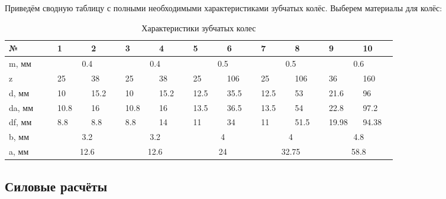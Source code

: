 \documentclass[14pt,a4paper,russian]{scrartcl}
\begin{document}
        Приведём сводную таблицу с полными необходимыми характеристиками зубчатых колёс.
        Выберем материалы для колёс:
        \begin{table}[h!]
            \begin{center}
                \begin{tabular}{p{0.1\linewidth}|p{0.07\linewidth}p{0.07\linewidth}p{0.07\linewidth}p{0.07\linewidth}p{0.07\linewidth}p{0.07\linewidth}p{0.07\linewidth}p{0.07\linewidth}p{0.07\linewidth}p{0.07\linewidth}}
                    \hline
                    №   & 1&2&3&4&5&6&7&8&9&10\\
                    \hline
                    m, мм  & \multicolumn{2}{c}{0.4} & \multicolumn{2}{c}{0.4} & \multicolumn{2}{c}{0.5} & \multicolumn{2}{c}{0.5} & \multicolumn{2}{c}{0.6} \\
                    z       & 25 &  38 &  25 &  38 &  25 & 106 &   25 &  106 &  36 &  160 \\
                    d, мм   & 10 &  15.2 &  10 &  15.2 &  12.5 & 35.5 &   12.5 &  53 &  21.6 &  96 \\
                    da, мм  & 10.8 & 16 & 10.8 & 16 & 13.5 & 36.5 & 13.5 & 54 & 22.8 & 97.2 \\
                    df, мм  & 8.8 & 8.8 & 8.8 & 14 & 11 & 34 & 11 & 51.5 & 19.98 & 94.38 \\
                    b, мм & \multicolumn{2}{c}{3.2} &  \multicolumn{2}{c}{3.2} &  \multicolumn{2}{c}{4} & \multicolumn{2}{c}{4} &\multicolumn{2}{c}{4.8} \\
                    a, мм & \multicolumn{2}{c}{12.6} & \multicolumn{2}{c}{12.6} & \multicolumn{2}{c}{24} & \multicolumn{2}{c}{32.75} & \multicolumn{2}{c}{58.8} \\
                    \hline
                \end{tabular}
                \caption{{Характеристики зубчатых колес}}\label{tab:gears_digest}
            \end{center}
        \end{table}

    
\subsection{Силовые расчёты}
\end{document}
